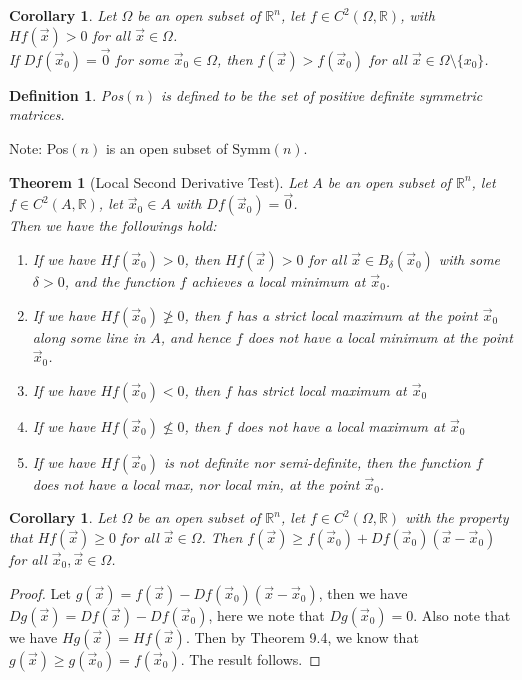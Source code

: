 \documentclass[15pt]{book}
\theoremstyle{break}
\theoremstyle{break}
\newtheorem{thm}{Theorem}[section]
\newtheorem{corT}[lem]{Corollary}
\newtheorem{defn}{Definition}[corL]
\newcommand{\R}{\mathbb{R}}
\newcommand{\Symm}{\text{Symm}}
\newcommand{\note}{\color{red}Note: \color{black}}
\begin{document}
\begin{corT}
Let $\Omega$ be an open subset of $\R^n$, let $f \in C^2(\Omega, \R)$, with $Hf(\vec{x})> 0$ for all $\vec{x}\in \Omega$. \\
If $Df(\vec{x}_0)= \vec{0}$ for some $\vec{x}_0 \in \Omega$, then $f(\vec{x}) > f(\vec{x}_0)$ for all $\vec{x} \in \Omega\setminus \{x_0\}$. 
\end{corT}


\begin{defn}
Pos$(n) $ is defined to be the set of positive definite symmetric matrices.
\end{defn}
\note Pos$(n) $ is an open subset of $\Symm(n)$.
\newpage

\begin{thm}[Local Second Derivative Test]
Let $A$ be an open subset of $\R^n$, let $f \in C^2(A , \R)$, let $\vec{x}_0 \in A$ with $Df(\vec{x}_0) = \vec{0}$. \\
Then we have the followings hold:
\begin{enumerate}[topsep=3pt,itemsep=-1ex,partopsep=1ex,parsep=1ex]
\item If we have $Hf(\vec{x}_0) > 0$, then $Hf(\vec{x})>0$ for all $\vec{x}\in B_\delta(\vec{x}_0)$ with some $\delta>0$, and the function $f$ achieves a local minimum at $\vec{x}_0$.
\item If we have $Hf(\vec{x}_0) \ngeq 0$, then $f$ has a strict local maximum at the point $\vec{x}_0$ along some line in $A$, and hence $f$ does not have a local minimum at the point $\vec{x}_0$.
\item If we have  $Hf(\vec{x}_0) < 0$, then $f$ has strict local maximum at $\vec{x}_0$
\item If we have $Hf(\vec{x}_0) \nleq 0$, then $f$ does not have a local maximum at $\vec{x}_0$
\item If we have $Hf(\vec{x}_0)$ is not definite nor semi-definite, then the function $f$ does not have a local max, nor local min, at the point $\vec{x}_0$.
\end{enumerate}
\end{thm}

\begin{corT}
Let $\Omega$ be an open subset of $\R^n$, let $f \in C^2(\Omega, \R)$ with the property that $Hf(\vec{x})\geq 0$ for all $\vec{x}\in \Omega$. Then $f(\vec{x}) \geq f(\vec{x}_0) + Df(\vec{x}_0)(\vec{x}-\vec{x}_0)$ for all $\vec{x}_0,\vec{x}\in \Omega$.
\end{corT}
\begin{proof}
Let $g(\vec{x}) = f(\vec{x}) - Df(\vec{x}_0)(\vec{x}-\vec{x}_0)$, then we have $Dg(\vec{x}) =  Df(\vec{x}) - Df(\vec{x}_0)$, here we note that $Dg(\vec{x}_0) = 0$. Also note that we have $Hg(\vec{x}) = Hf(\vec{x})$. Then by Theorem 9.4, we know that $g(\vec{x}) \geq g(\vec{x}_0) = f(\vec{x}_0)$. The result follows.
\end{proof}
\end{document}
